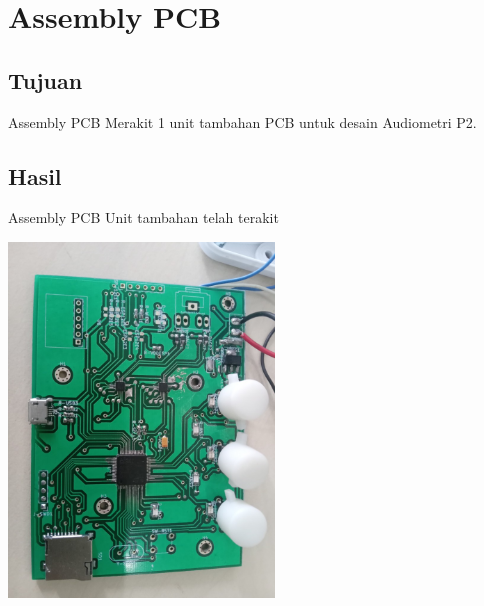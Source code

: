 \documentclass[table,dvipsnames]{beamer}
\begin{document}
	\section{Assembly PCB}
	\begin{frame}
		\subsection{Tujuan}
		\begin{exampleblock}{Assembly PCB}
			Merakit 1 unit tambahan PCB untuk desain Audiometri P2.
		\end{exampleblock}
	
		\subsection{Hasil}
		\begin{exampleblock}{Assembly PCB}
			Unit tambahan telah terakit
			\begin{center}
				\includegraphics[width=200pt]{images/assembly_hasil}
			\end{center}
		\end{exampleblock}
	\end{frame}
\end{document}
